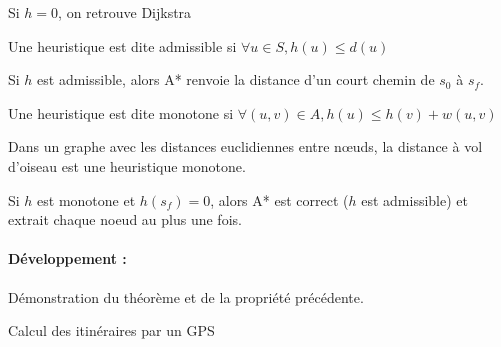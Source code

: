 \begin{rem}
	Si $h = 0$, on retrouve Dijkstra
\end{rem}

\begin{definition}
	Une heuristique est dite admissible si $\forall u \in S, h(u) \leq d(u)$
\end{definition}

\begin{theorem}[Correction]
	Si $h$ est admissible, alors A* renvoie la distance d'un court chemin de $s_0$ à $s_f$.
\end{theorem}

\begin{definition}
	Une heuristique est dite monotone si $\forall (u,v) \in A, h(u) \leq h(v) + w(u,v)$
\end{definition}

\begin{rem}
	Dans un graphe avec les distances euclidiennes entre nœuds, la distance à vol d'oiseau est une heuristique monotone.
\end{rem}

\begin{proposition}
	Si $h$ est monotone et $h(s_f) = 0$, alors A* est correct ($h$ est admissible) et extrait chaque noeud au plus une fois.
\end{proposition}

\paragraph{Développement :} Démonstration du théorème et de la propriété précédente.

\begin{appl}
	Calcul des itinéraires par un GPS
\end{appl}